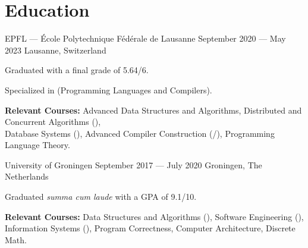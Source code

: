 \section*{Education}

\begin{cventries}
{EPFL --- École Polytechnique Fédérale de Lausanne} %
{September 2020 --- May 2023} %
{Lausanne, Switzerland} %
{%
  \begin{cvitems}
    \item Graduated with a final grade of 5.64/6.
	\item Specialized in  (Programming Languages and Compilers).
    \item \textbf{Relevant Courses:} Advanced Data Structures and Algorithms, Distributed and Concurrent Algorithms (),\\Database Systems (), Advanced Compiler Construction (/), Programming Language Theory.
  \end{cvitems}
}
{University of Groningen}  %
{September 2017 --- July 2020} %
{Groningen, The Netherlands} %
{%
  \begin{cvitems}
    \item Graduated \textit{summa cum laude} with a GPA of 9.1/10.
    \item \textbf{Relevant Courses:} Data Structures and Algorithms (), Software Engineering (),\\
        Information Systems (), Program Correctness, Computer Architecture, Discrete Math.
  \end{cvitems}
}
\end{cventries}
